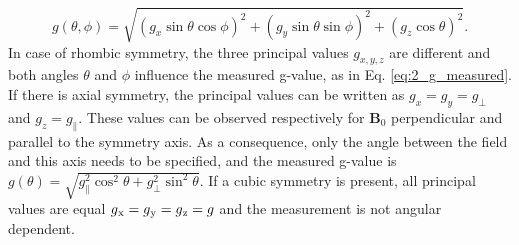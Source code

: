 \documentclass[a4paper]{book}
\newcommand{\tsub}{\textsubscript}
\newcommand{\mb}{\mathbf}
\begin{document}
	\begin{equation}
		g(\theta, \phi) = 
		\sqrt{(g_x\sin\theta\cos\phi)^2 + (g_y\sin\theta\sin\phi)^2 +  (g_z\cos\theta)^2}.
		\label{eq:2_g_measured}
	\end{equation}
	In case of rhombic symmetry, the three principal values $g_{x,y,z}$ are different and both angles $\theta$ and $\phi$ influence the measured g-value, as in Eq. \eqref{eq:2_g_measured}. If there is axial symmetry, the principal values can be written as $g_x = g_y = g_{\perp}$ and $g_z = g_\parallel$. These values can be observed respectively for $\mb{B}_0$ perpendicular and parallel to the symmetry axis. As a consequence, only the angle between the field and this axis needs to be specified, and the measured g-value is $g(\theta) = \sqrt{g_\parallel^2\cos^2\theta + g_\perp^2\sin^2\theta}$. If a cubic symmetry is present, all principal values are equal $g\tsub{x} = g\tsub{y} = g\tsub{z} = g$ and the measurement is not angular dependent.	
	
\end{document}

